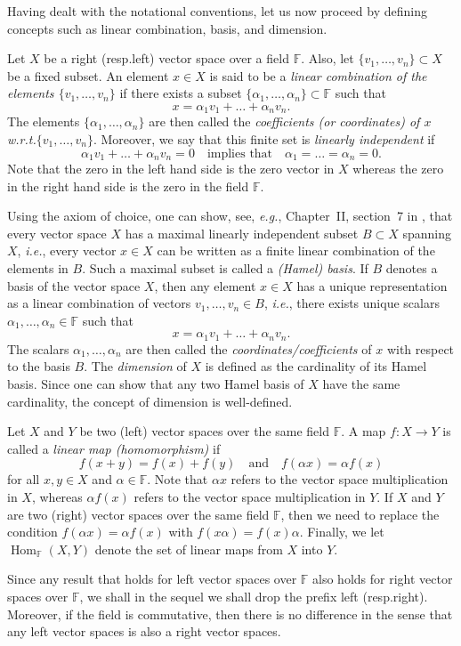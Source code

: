 \documentclass[a4paper]{paper}
\newcommand{\Field}{\mathbb{F}}
\DeclareMathOperator{\Hom}{Hom}
\newcommand{\ie}{\textsl{i.e.}\xspace}
\newcommand{\eg}{\textsl{e.g.}\xspace}
\begin{document}
Having dealt with the notational conventions, let us now proceed by defining concepts such 
as linear combination, basis, and dimension.
\begin{definition}
   Let $X$ be a right (resp.\@ left) vector space over a field $\Field$. Also, 
   let $\{ v_1, \ldots, v_{n} \}  \subset X$ be a fixed subset. An element $x\in X$ 
   is said to be a \emph{linear combination of the elements $\{ v_1, \ldots, v_{n} \}$} if 
   there exists a subset $\{ \alpha_1,\ldots,\alpha_{n} \} \subset \Field$ such that 
   \[  x= \alpha_1 v_1 + \ldots +  \alpha_{n} v_{n}. \]
   The elements $\{ \alpha_1,\ldots,\alpha_{n} \}$ are then called the \emph{coefficients 
  (or coordinates)  of $x$ w.r.t.\@ $\{ v_1, \ldots, v_{n} \}$}. Moreover, we say that this finite 
  set is \emph{linearly independent} if 
   \[ \alpha_1 v_1 + \ldots + \alpha_{n} v_{n} =0
      \quad\text{implies that}\quad \alpha_1=\ldots=\alpha_{n}=0. \]
  Note that the zero in the left hand side is the zero vector in $X$ whereas the zero in the right 
  hand side is the zero in the field $\Field$.
\end{definition}
Using the axiom of choice, one can show, see, \eg, Chapter~II, section~7 in \cite{Bo89}, 
that every vector space $X$ has a maximal linearly independent subset $B \subset X$ 
spanning $X$, \ie, every vector $x\in X$ can be written as a finite linear combination 
of the elements in $B$. Such a maximal subset is called a \emph{(Hamel) basis}. If 
$B$ denotes a basis of the vector space $X$, then any element $x\in X$ has a 
unique representation as a linear combination of vectors $v_1,\ldots,v_{n}\in B$, \ie, there 
exists unique scalars $\alpha_1,\ldots,\alpha_{n}\in\Field$ such that 
\[ x = \alpha_1 v_1 + \ldots + \alpha_{n} v_{n}. \]
The scalars $\alpha_1,\ldots,\alpha_{n}$ are then called the  \emph{coordinates/coefficients}
of $x$ with respect to the basis $B$. The \emph{dimension} of $X$ is defined as the cardinality 
of its Hamel basis. Since one can show that any two Hamel basis of $X$ 
have the same cardinality, the concept of dimension is well-defined.
\begin{definition}
  Let $X$ and $Y$ be two (left) vector spaces over the same field $\Field$. A map
  $f \colon X \to Y$ is called a \emph{linear map (homomorphism)} if
  \[  f(x+y)=f(x)+f(y) \quad\text{and}\quad
      f(\alpha x)=\alpha f(x)  \]
  for all $x,y\in X$ and $\alpha\in \Field$.
  Note that $\alpha x$ refers to the vector space multiplication in $X$, whereas $\alpha f(x)$
  refers to the vector space multiplication in $Y$.
  If $X$ and $Y$ are two (right) vector spaces over the same field $\Field$, then we need to
  replace the condition $f(\alpha x)=\alpha f(x)$ with $f(x\alpha)= f(x) \alpha$.
  Finally,  we let  $\Hom_{\Field}(X,Y)$ denote the set of linear maps from $X$ into $Y$.
\end{definition}   
Since any result that holds for left vector spaces over $\Field$ also holds for right vector spaces 
over $\Field$, we shall in the sequel we shall drop the prefix left (resp.\@ right). Moreover, if
the field is commutative, then there is no difference in the sense that any left vector spaces
is also a right vector spaces.
\end{document}
